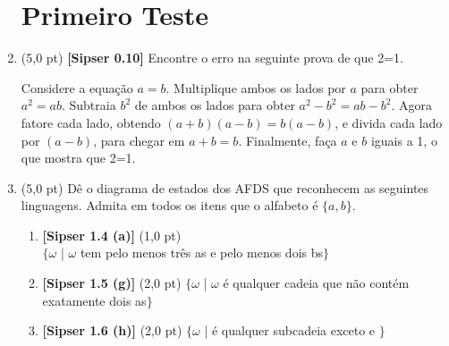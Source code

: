 \documentclass[12pt,a4paper,oneside]{article}
\begin{document}
\begin{enumerate}
	
	\section*{Primeiro Teste}
	
	\item (5,0 pt) {\bf [Sipser 0.10]} Encontre o erro na seguinte prova de que 2=1.
	\begin{flushleft}
		Considere a equação $a=b$. Multiplique ambos os lados por $a$ para obter $a^2 = ab$. Subtraia $b^2$ de ambos os lados para obter $a^2 - b^2 = ab-b^2$. Agora fatore cada lado, obtendo $(a+b)(a-b) = b(a-b)$, e divida cada lado por $(a-b)$, para chegar em $a+b = b$. Finalmente, faça $a$ e $b$ iguais a 1, o que mostra que 2=1.
	\end{flushleft}
	
	
	\item (5,0 pt) Dê o diagrama de estados dos AFDS que reconhecem as seguintes linguagens. Admita em todos os itens que o alfabeto é  $\{a,b\}$.
		\begin{enumerate}
			\item {\bf [Sipser 1.4 (a)]} (1,0 pt) \\$\{\omega$ | $\omega$ tem pelo menos três {\sf a}s e pelo menos dois {\sf b}s$\}$
			\item {\bf [Sipser 1.5 (g)]} (2,0 pt) $\{\omega$ | $\omega$ é qualquer cadeia que não contém exatamente dois {\sf a}s$\}$
			\item {\bf [Sipser 1.6 (h)]} (2,0 pt) $\{\omega$ | é qualquer subcadeia exceto {\sf 11} e {1}$\}$
		\end{enumerate}

\end{enumerate}
\end{document}
